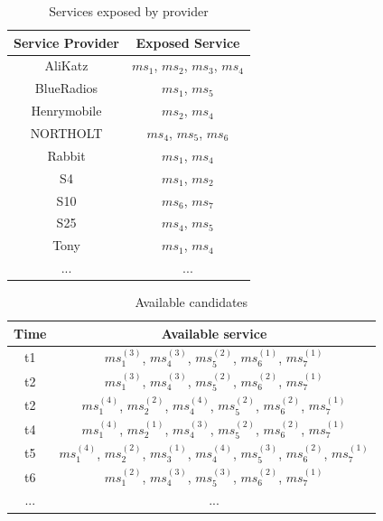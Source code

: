 \documentclass[10pt,journal,compsoc]{IEEEtran}
\begin{document}
\begin{table}[!t]
\renewcommand{\arraystretch}{1.3}
\caption{Services exposed by provider}
\label{table_example}
\centering
\begin{tabular}{c c}
\hline
\bfseries Service Provider & \bfseries Exposed Service\\
\hline
AliKatz     & $ms_1$, $ms_2$, $ms_3$, $ms_4$\\
BlueRadios  & $ms_1$, $ms_5$\\
Henrymobile & $ms_2$, $ms_4$\\
NORTHOLT    & $ms_4$, $ms_5$, $ms_6$ \\
Rabbit      & $ms_1$, $ms_4$\\
S4          & $ms_1$, $ms_2$\\
S10         & $ms_6$, $ms_7$\\
S25         & $ms_4$, $ms_5$\\
Tony        & $ms_1$, $ms_4$\\
... & ...\\
\hline
\end{tabular}
\end{table}

\begin{table}[!t]
\renewcommand{\arraystretch}{1.8}
\caption{Available candidates}
\label{table_example}
\centering
\begin{tabular}{c c}
\hline
\bfseries Time & \bfseries Available service\\
\hline
t1     & $ms_1^{(3)}$, $ms_4^{(3)}$, $ms_5^{(2)}$, $ms_6^{(1)}$, $ms_7^{(1)}$ \\
t2     & $ms_1^{(3)}$, $ms_4^{(3)}$, $ms_5^{(2)}$, $ms_6^{(2)}$, $ms_7^{(1)}$ \\
t2     & $ms_1^{(4)}$, $ms_2^{(2)}$, $ms_4^{(4)}$, $ms_5^{(2)}$, $ms_6^{(2)}$, $ms_7^{(1)}$ \\
t4     & $ms_1^{(4)}$, $ms_2^{(1)}$, $ms_4^{(3)}$, $ms_5^{(2)}$, $ms_6^{(2)}$, $ms_7^{(1)}$ \\
t5     & $ms_1^{(4)}$, $ms_2^{(2)}$, $ms_3^{(1)}$, $ms_4^{(4)}$, $ms_5^{(3)}$, $ms_6^{(2)}$, $ms_7^{(1)}$ \\
t6     & $ms_1^{(2)}$, $ms_4^{(3)}$, $ms_5^{(3)}$, $ms_6^{(2)}$, $ms_7^{(1)}$ \\
... & ...\\
\hline
\end{tabular}
\end{table}
\end{document}
